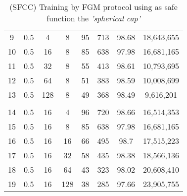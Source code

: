 \begin{table}[H]
\begin{tabular}{|c|c|c|c|c|c|c|c|}
        9                      & 0.5                   & 4                     & 8                     & 95                    & 713                   & 98.68                 & 18,643,655               \\
        10                     & 0.5                   & 16                    & 8                     & 85                    & 638                   & 97.98                 & 16,681,165               \\
        11                     & 0.5                   & 32                    & 8                     & 55                    & 413                   & 98.61                 & 10,793,695               \\
        12                     & 0.5                   & 64                    & 8                     & 51                    & 383                   & 98.59                 & 10,008,699               \\
        13                     & 0.5                   & 128                   & 8                     & 49                    & 368                   & 98.49                 & 9,616,201                \\
        \hline
        \multicolumn{1}{|l|}{} & \multicolumn{1}{l|}{} & \multicolumn{1}{l|}{} & \multicolumn{1}{l|}{} & \multicolumn{1}{l|}{} & \multicolumn{1}{l|}{} & \multicolumn{1}{l|}{} & \multicolumn{1}{l|}{}    \\
        \hline
        14                     & 0.5                   & 16                    & 4                     & 96                    & 720                   & 98.66                 & 16,514,353               \\
        15                     & 0.5                   & 16                    & 8                     & 85                    & 638                   & 97.98                 & 16,681,165               \\
        16                     & 0.5                   & 16                    & 16                    & 66                    & 495                   & 98.7                  & 17,515,223               \\
        17                     & 0.5                   & 16                    & 32                    & 58                    & 435                   & 98.38                 & 18,566,136               \\
        18                     & 0.5                   & 16                    & 64                    & 43                    & 323                   & 98.02                 & 20,608,410               \\
        19                     & 0.5                   & 16                    & 128                   & 38                    & 285                   & 97.66                 & 23,905,755               \\
        \hline
    \end{tabular}
    \caption{(SFCC) Training by FGM protocol using as safe function the \emph{'spherical cap'}}
    \label{tab:table-fgm-sf2-class-exp}
\end{table}

